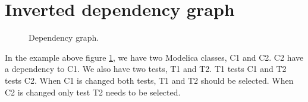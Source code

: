 \documentclass{cslthse-msc}
\begin{document}
\section{Inverted dependency graph}
\begin{figure}[H]
    \centering
    \caption{Dependency graph.}
    \label{fig:dependencyGraph}
\end{figure}
In the example above figure \ref{fig:dependencyGraph}, we have two Modelica classes, C1 and C2. C2 have a dependency to C1. We also have two tests, T1 and T2. T1 tests C1 and T2 tests C2. When C1 is changed both tests, T1 and T2 should be selected. When C2 is changed only test T2 needs to be selected.
\end{document}
